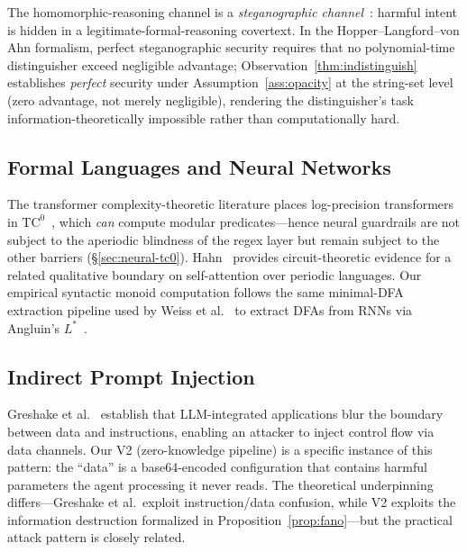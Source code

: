 \documentclass[letterpaper,twocolumn,10pt]{article}
\theoremstyle{definition}
\theoremstyle{remark}
\begin{document}
The homomorphic-reasoning channel is a \emph{steganographic
channel}~\cite{hopper2002steganography}: harmful intent is hidden in a
legitimate-formal-reasoning covertext.
In the Hopper--Langford--von Ahn formalism, perfect steganographic
security requires that no polynomial-time distinguisher exceed negligible
advantage; Observation~\ref{thm:indistinguish} establishes \emph{perfect}
security under Assumption~\ref{ass:opacity} at the string-set level (zero
advantage, not merely negligible), rendering the distinguisher's task
information-theoretically impossible rather than computationally hard.

\subsection{Formal Languages and Neural Networks}\label{sec:related-formal}

The transformer complexity-theoretic literature places log-precision
transformers in $\mathrm{TC}^0$~\cite{merrill2023saturated,chiang2023tighter,merrill2024survey},
which \emph{can} compute modular predicates---hence neural guardrails are
not subject to the aperiodic blindness of the regex layer but remain
subject to the other barriers (\S\ref{sec:neural-tc0}).
Hahn~\cite{hahn2020limitations} provides circuit-theoretic evidence for a
related qualitative boundary on self-attention over periodic languages.
Our empirical syntactic monoid computation follows the same minimal-DFA
extraction pipeline used by Weiss et al.~\cite{weiss2022extracting} to
extract DFAs from RNNs via Angluin's $L^*$~\cite{angluin1987}.

\subsection{Indirect Prompt Injection}\label{sec:related-injection}

Greshake et al.~\cite{greshake2023injection} establish that LLM-integrated
applications blur the boundary between data and instructions, enabling an attacker
to inject control flow via data channels.
Our V2 (zero-knowledge pipeline) is a specific instance of this pattern: the
``data'' is a base64-encoded configuration that contains harmful parameters the
agent processing it never reads.
The theoretical underpinning differs---Greshake et al.\ exploit instruction/data
confusion, while V2 exploits the information destruction formalized in
Proposition~\ref{prop:fano}---but the practical attack pattern is closely related.
\end{document}
